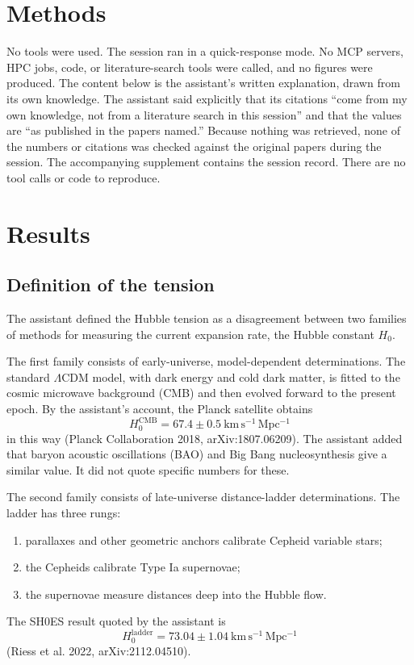 \documentclass[11pt,a4paper]{article}
\begin{document}
\section{Methods}
No tools were used. The session ran in a quick-response mode. No MCP servers, HPC jobs, code, or literature-search tools were called, and no figures were produced. The content below is the assistant's written explanation, drawn from its own knowledge. The assistant said explicitly that its citations ``come from my own knowledge, not from a literature search in this session'' and that the values are ``as published in the papers named.'' Because nothing was retrieved, none of the numbers or citations was checked against the original papers during the session. The accompanying supplement contains the session record. There are no tool calls or code to reproduce.

\section{Results}

\subsection{Definition of the tension}
The assistant defined the Hubble tension as a disagreement between two families of methods for measuring the current expansion rate, the Hubble constant $H_0$.

The first family consists of early-universe, model-dependent determinations. The standard $\Lambda$CDM model, with dark energy and cold dark matter, is fitted to the cosmic microwave background (CMB) and then evolved forward to the present epoch. By the assistant's account, the Planck satellite obtains
\begin{equation}
H_0^{\mathrm{CMB}} = 67.4 \pm 0.5\ \mathrm{km\,s^{-1}\,Mpc^{-1}}
\end{equation}
in this way (Planck Collaboration 2018, arXiv:1807.06209). The assistant added that baryon acoustic oscillations (BAO) and Big Bang nucleosynthesis give a similar value. It did not quote specific numbers for these.

The second family consists of late-universe distance-ladder determinations. The ladder has three rungs:
\begin{enumerate}
\item parallaxes and other geometric anchors calibrate Cepheid variable stars;
\item the Cepheids calibrate Type Ia supernovae;
\item the supernovae measure distances deep into the Hubble flow.
\end{enumerate}
The SH0ES result quoted by the assistant is
\begin{equation}
H_0^{\mathrm{ladder}} = 73.04 \pm 1.04\ \mathrm{km\,s^{-1}\,Mpc^{-1}}
\end{equation}
(Riess et al. 2022, arXiv:2112.04510).
\end{document}
